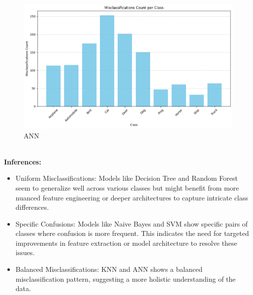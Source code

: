 \documentclass[a4paper]{article}
\theoremstyle{plain}
\theoremstyle{definition}
\begin{document}
\begin{enumerate}
\begin{figure}[h]
\begin{minipage}{0.45\textwidth}
    \end{minipage}\hfill
    \begin{minipage}{0.45\textwidth}
        \centering
        \caption{ANN}
        \includegraphics[width=\linewidth]{ANN.png}
    \end{minipage}
    \vspace{0.5cm}
\end{figure}\\
\textbf{Inferences:}
\begin{itemize}
    \item Uniform Misclassifications: Models like Decision Tree and Random Forest seem to generalize well across various classes but might benefit from more nuanced feature engineering or deeper architectures to capture intricate class differences.
    \item Specific Confusions: Models like Naive Bayes and SVM show specific pairs of classes where confusion is more frequent. This indicates the need for targeted improvements in feature extraction or model architecture to resolve these issues.
    \item Balanced Misclassifications: KNN and ANN shows a balanced misclassification pattern, suggesting a more holistic understanding of the data. 
\end{itemize}
\end{enumerate}


	\newpage
	
	
\end{document}
